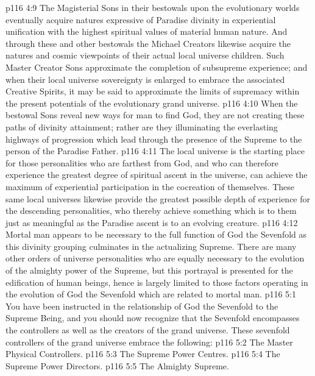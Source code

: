 \vs p116 4:9 The Magisterial Sons in their bestowals upon the evolutionary worlds eventually acquire natures expressive of Paradise divinity in experiential unification with the highest spiritual values of material human nature. And through these and other bestowals the Michael Creators likewise acquire the natures and cosmic viewpoints of their actual local universe children. Such Master Creator Sons approximate the completion of subsupreme experience; and when their local universe sovereignty is enlarged to embrace the associated Creative Spirits, it may be said to approximate the limits of supremacy within the present potentials of the evolutionary grand universe.
\vs p116 4:10 When the bestowal Sons reveal new ways for man to find God, they are not creating these paths of divinity attainment; rather are they illuminating the everlasting highways of progression which lead through the presence of the Supreme to the person of the Paradise Father.
\vs p116 4:11 The local universe is the starting place for those personalities who are farthest from God, and who can therefore experience the greatest degree of spiritual ascent in the universe, can achieve the maximum of experiential participation in the cocreation of themselves. These same local universes likewise provide the greatest possible depth of experience for the descending personalities, who thereby achieve something which is to them just as meaningful as the Paradise ascent is to an evolving creature.
\vs p116 4:12 \pc Mortal man appears to be necessary to the full function of God the Sevenfold as this divinity grouping culminates in the actualizing Supreme. There are many other orders of universe personalities who are equally necessary to the evolution of the almighty power of the Supreme, but this portrayal is presented for the edification of human beings, hence is largely limited to those factors operating in the evolution of God the Sevenfold which are related to mortal man.
\vs p116 5:1 You have been instructed in the relationship of God the Sevenfold to the Supreme Being, and you should now recognize that the Sevenfold encompasses the controllers as well as the creators of the grand universe. These sevenfold controllers of the grand universe embrace the following:
\vs p116 5:2 \bibnobreakspace The Master Physical Controllers.
\vs p116 5:3 \bibnobreakspace The Supreme Power Centres.
\vs p116 5:4 \bibnobreakspace The Supreme Power Directors.
\vs p116 5:5 \bibnobreakspace The Almighty Supreme.
